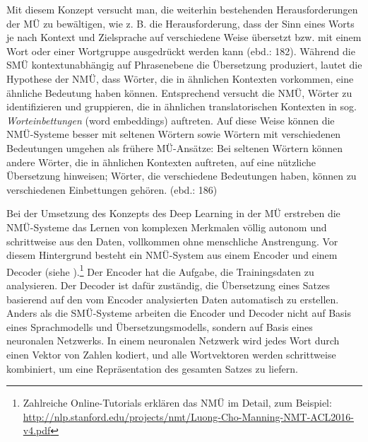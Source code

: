 Mit diesem Konzept versucht man, die weiterhin bestehenden Herausforderungen der MÜ zu bewältigen, wie z. B. die Herausforderung, dass der Sinn eines Worts je nach Kontext und Zielsprache auf verschiedene Weise übersetzt bzw. mit einem Wort oder einer Wortgruppe ausgedrückt werden kann (ebd.: 182). Während die SMÜ kontextunabhängig auf Phrasenebene die Übersetzung produziert, lautet die Hypothese der NMÜ, dass Wörter, die in ähnlichen Kontexten vorkommen, eine ähnliche Bedeutung haben können. Entsprechend versucht die NMÜ, Wörter zu identifizieren und gruppieren, die in ähnlichen translatorischen Kontexten in sog. \textit{Worteinbettungen} (word embeddings) auftreten. Auf diese Weise können die NMÜ-Systeme besser mit seltenen Wörtern sowie Wörtern mit verschiedenen Bedeutungen umgehen als frühere MÜ-Ansätze: Bei seltenen Wörtern können andere Wörter, die in ähnlichen Kontexten auftreten, auf eine nützliche Übersetzung hinweisen; Wörter, die verschiedene Bedeutungen haben, können zu verschiedenen Einbettungen gehören. (ebd.: 186)

Bei der Umsetzung des Konzepts des Deep Learning in der MÜ erstreben die NMÜ-Systeme das Lernen von komplexen Merkmalen völlig autonom und schrittweise aus den Daten, vollkommen ohne menschliche Anstrengung. Vor diesem Hintergrund besteht ein NMÜ-System aus einem Encoder und einem Decoder (siehe ).\footnote{Zahlreiche Online-Tutorials erklären das NMÜ im Detail, zum Beispiel: \url{http://nlp.stanford.edu/projects/nmt/Luong-Cho-Manning-NMT-ACL2016-v4.pdf}} Der Encoder hat die Aufgabe, die Trainingsdaten zu analysieren. Der Decoder ist dafür zuständig, die Übersetzung eines Satzes basierend auf den vom Encoder analysierten Daten automatisch zu erstellen. Anders als die SMÜ-Systeme arbeiten die Encoder und Decoder nicht auf Basis eines Sprachmodells und Übersetzungsmodells, sondern auf Basis eines neuronalen Netzwerks. In einem neuronalen Netzwerk wird jedes Wort durch einen Vektor von Zahlen kodiert, und alle Wortvektoren werden schrittweise kombiniert, um eine Repräsentation des gesamten Satzes zu liefern. \citep{XingEtAl2016}


